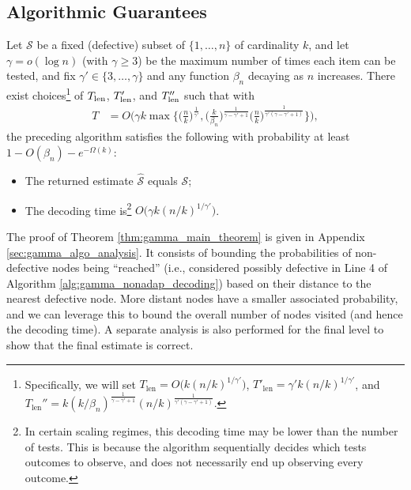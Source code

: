 \subsection{Algorithmic Guarantees}

\begin{theorem} \label{thm:gamma_main_theorem}
Let $\mathcal{S}$ be a fixed (defective) subset of $\{1,\dots,n\}$ of cardinality $k$, and let $\gamma=o(\log n)$ (with $\gamma \ge 3$) be the maximum number of times each item can be tested, and fix $\gamma'\in\{3,\dots,\gamma\}$ and any function $\beta_n$ decaying as $n$ increases. There exist choices\footnote{Specifically, we will set $T_{\text{len}}=O\big( k(n/k)^{1/\gamma'} \big)$, $T'_{\text{len}}=\gamma'k(n/k)^{1/\gamma'}$, and $T_{\text{len}}''=k(k/\beta_n)^{\frac{1}{\gamma-\gamma'+1}}(n/k)^{\frac{1}{\gamma'(\gamma-\gamma'+1)}}$.} of $T_{\rm len}$, $T'_{\rm len}$, and $T''_{\rm len}$ such that with 
\begin{align}
    T&=O\bigg(\gamma k\max\bigg\{\Big(\frac{n}{k}\Big)^{\frac{1}{\gamma'}},
    \Big(\frac{k}{\beta_n}\Big)^{\frac{1}{\gamma-\gamma'+1}}\Big(\frac{n}{k}\Big)^{\frac{1}{\gamma'(\gamma-\gamma'+1)}}\bigg\}\bigg),
    \label{eq:gamma_main_thm_test} 
\end{align}
the preceding algorithm satisfies the following with probability at least $1-O(\beta_n)-e^{-\Omega(k)}$:
\begin{itemize}
    \item The returned estimate $\widehat{\mathcal{S}}$ equals $\mathcal{S}$;
    \item The decoding time is\footnote{In certain scaling regimes, this decoding time may be lower than the number of tests. This is because the algorithm sequentially decides which tests outcomes to observe, and does not necessarily end up observing every outcome.} $O\big(\gamma k(n/k)^{1/\gamma'}\big)$.
\end{itemize}
\end{theorem}
The proof of Theorem \ref{thm:gamma_main_theorem} is given in Appendix \ref{sec:gamma_algo_analysis}.  It consists of bounding the probabilities of non-defective nodes being ``reached'' (i.e., considered possibly defective in Line 4 of Algorithm \ref{alg:gamma_nonadap_decoding}) based on their distance to the nearest defective node.  More distant nodes have a smaller associated probability, and we can leverage this to bound the overall number of nodes visited (and hence the decoding time).  A separate analysis is also performed for the final level to show that the final estimate is correct.

